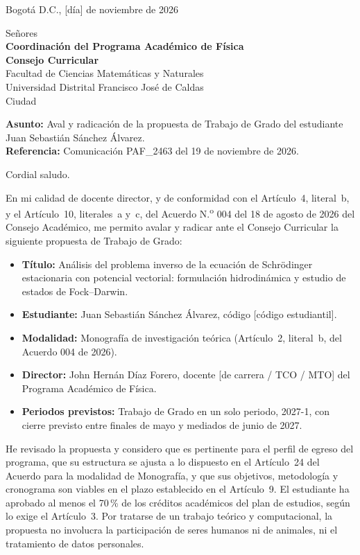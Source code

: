 \documentclass[11pt,letterpaper]{article}
\begin{document}
Bogotá D.C., [día] de noviembre de 2026

\vspace{1em}
Señores\\
\textbf{Coordinación del Programa Académico de Física}\\
\textbf{Consejo Curricular}\\
Facultad de Ciencias Matemáticas y Naturales\\
Universidad Distrital Francisco José de Caldas\\
Ciudad

\vspace{0.5em}
\textbf{Asunto:} Aval y radicación de la propuesta de Trabajo de Grado del estudiante Juan Sebastián Sánchez Álvarez.\\
\textbf{Referencia:} Comunicación PAF\_2463 del 19 de noviembre de 2026.

Cordial saludo.

En mi calidad de docente director, y de conformidad con el Artículo~4, literal~b, y el Artículo~10, literales~a y~c, del
Acuerdo N.\textsuperscript{o} 004 del 18 de agosto de 2026 del Consejo Académico, me permito avalar y radicar ante el
Consejo Curricular la siguiente propuesta de Trabajo de Grado:

\begin{itemize}[leftmargin=1.5em, itemsep=0.2em]
  \item \textbf{Título:} Análisis del problema inverso de la ecuación de Schrödinger estacionaria con potencial vectorial:
        formulación hidrodinámica y estudio de estados de Fock--Darwin.
  \item \textbf{Estudiante:} Juan Sebastián Sánchez Álvarez, código [código estudiantil].
  \item \textbf{Modalidad:} Monografía de investigación teórica (Artículo~2, literal~b, del Acuerdo 004 de 2026).
  \item \textbf{Director:} John Hernán Díaz Forero, docente [de carrera / TCO / MTO] del Programa Académico de Física.
  \item \textbf{Periodos previstos:} Trabajo de Grado en un solo periodo, 2027-1, con cierre previsto entre finales de mayo y mediados de junio de 2027.
\end{itemize}

He revisado la propuesta y considero que es pertinente para el perfil de egreso del programa, que su estructura se ajusta
a lo dispuesto en el Artículo~24 del Acuerdo para la modalidad de Monografía, y que sus objetivos, metodología y
cronograma son viables en el plazo establecido en el Artículo~9. El estudiante ha aprobado al menos el 70\,\% de los
créditos académicos del plan de estudios, según lo exige el Artículo~3. Por tratarse de un trabajo teórico y
computacional, la propuesta no involucra la participación de seres humanos ni de animales, ni el tratamiento de datos
personales.
\end{document}
